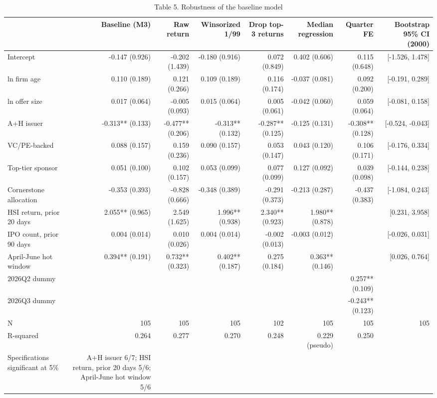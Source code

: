 \begin{table}[htbp]\centering\small
\caption{Table 5. Robustness of the baseline model}
\begin{tabular}{lrrrrrrr}
\hline
 & Baseline (M3) & Raw return & Winsorized 1/99 & Drop top-3 returns & Median regression & Quarter FE & Bootstrap 95\% CI (2000) \\
\hline
Intercept & -0.147 (0.926) & -0.202 (1.439) & -0.180 (0.916) & 0.072 (0.849) & 0.402 (0.606) & 0.115 (0.648) & [-1.526, 1.478] \\
ln firm age & 0.110 (0.189) & 0.121 (0.266) & 0.109 (0.189) & 0.116 (0.174) & -0.037 (0.081) & 0.092 (0.200) & [-0.191, 0.289] \\
ln offer size & 0.017 (0.064) & -0.005 (0.093) & 0.015 (0.064) & 0.005 (0.061) & -0.042 (0.060) & 0.059 (0.064) & [-0.081, 0.158] \\
A+H issuer & -0.313** (0.133) & -0.477** (0.206) & -0.313** (0.132) & -0.287** (0.125) & -0.125 (0.131) & -0.308** (0.128) & [-0.524, -0.043] \\
VC/PE-backed & 0.088 (0.157) & 0.159 (0.236) & 0.090 (0.157) & 0.053 (0.147) & 0.043 (0.120) & 0.106 (0.171) & [-0.176, 0.334] \\
Top-tier sponsor & 0.051 (0.100) & 0.102 (0.157) & 0.053 (0.099) & 0.077 (0.099) & 0.127 (0.092) & 0.039 (0.098) & [-0.144, 0.238] \\
Cornerstone allocation & -0.353 (0.393) & -0.828 (0.666) & -0.348 (0.389) & -0.291 (0.373) & -0.213 (0.287) & -0.437 (0.383) & [-1.084, 0.243] \\
HSI return, prior 20 days & 2.055** (0.965) & 2.549 (1.625) & 1.996** (0.938) & 2.340** (0.923) & 1.980** (0.878) &  & [0.231, 3.958] \\
IPO count, prior 90 days & 0.004 (0.014) & 0.010 (0.026) & 0.004 (0.014) & -0.002 (0.013) & -0.003 (0.012) &  & [-0.026, 0.031] \\
April-June hot window & 0.394** (0.191) & 0.732** (0.323) & 0.402** (0.187) & 0.275 (0.184) & 0.363** (0.146) &  & [0.026, 0.764] \\
2026Q2 dummy &  &  &  &  &  & 0.257** (0.109) &  \\
2026Q3 dummy &  &  &  &  &  & -0.243** (0.123) &  \\
N & 105 & 105 & 105 & 102 & 105 & 105 & 105 \\
R-squared & 0.264 & 0.277 & 0.270 & 0.248 & 0.229 (pseudo) & 0.250 &  \\
Specifications significant at 5\% & A+H issuer 6/7; HSI return, prior 20 days 5/6; April-June hot window 5/6 &  &  &  &  &  &  \\
\hline
\end{tabular}
\end{table}
